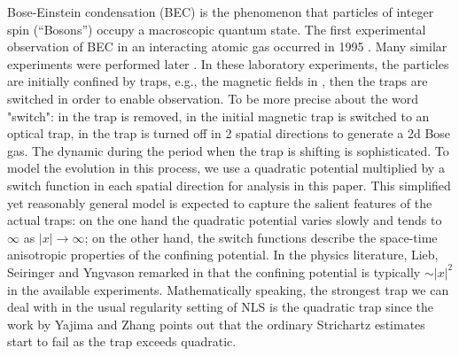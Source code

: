 \documentclass[reqno]{amsart}
\theoremstyle{plain}
\numberwithin{equation}{section}
\begin{document}
Bose-Einstein condensation (BEC) is the phenomenon that particles of integer
spin (\textquotedblleft Bosons\textquotedblright ) occupy a macroscopic
quantum state. The first experimental observation of BEC in an interacting
atomic gas occurred in 1995 \cite{Anderson, Davis}. Many similar experiments
were performed later \cite{Philips, Ketterle, Stamper}. In these laboratory
experiments, the particles are initially confined by traps, e.g., the
magnetic fields in \cite{Anderson, Davis}, then the traps are switched in
order to enable observation. To be more precise about the word "switch": in 
\cite{Anderson, Davis} the trap is removed, in \cite{Stamper} the initial
magnetic trap is switched to an optical trap, in \cite{Philips} the trap is
turned off in 2 spatial directions to generate a 2d Bose gas. The dynamic
during the period when the trap is shifting is sophisticated. To model the
evolution in this process, we use a quadratic potential multiplied by a
switch function in each spatial direction for analysis in this paper. This
simplified yet reasonably general model is expected to capture the salient
features of the actual traps: on the one hand the quadratic potential varies
slowly and tends to $\infty $ as $\left\vert x\right\vert \rightarrow \infty 
$; on the other hand, the switch functions describe the space-time
anisotropic properties of the confining potential. In the physics
literature, Lieb, Seiringer and Yngvason remarked in \cite{Lieb1} that the
confining potential is typically $\sim \left\vert x\right\vert ^{2}$ in the
available experiments. Mathematically speaking, the strongest trap we can
deal with in the usual regularity setting of NLS is the quadratic trap since
the work \cite{Yajima} by Yajima and Zhang points out that the ordinary
Strichartz estimates start to fail as the trap exceeds quadratic.
\end{document}
